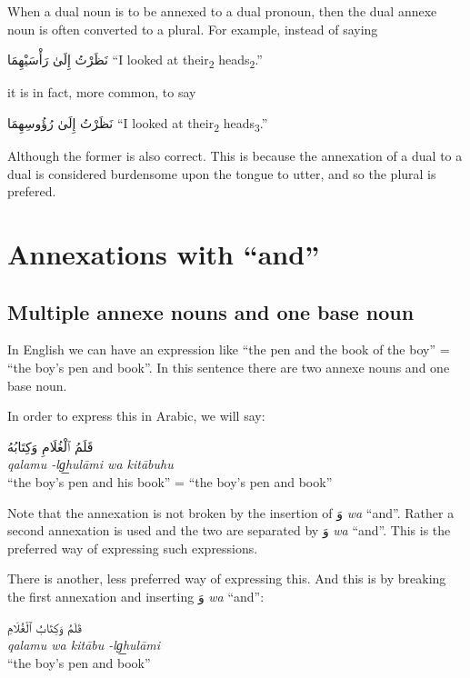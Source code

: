 \documentclass[
  10pt,
]{book}
\begin{document}
When a dual noun is to be annexed to a dual pronoun, then the dual annexe noun is often converted to a plural. For example, instead of saying

\foreignlanguage{arabic}{نَظَرْتُ إِلَىٰ رَأْسَيْهِمَا}
\enquote{I looked at their\textsubscript{2} heads\textsubscript{2}.}

it is in fact, more common, to say

\foreignlanguage{arabic}{نَظَرْتُ إِلَىٰ رُؤُوسِهِمَا}
\enquote{I looked at their\textsubscript{2} heads\textsubscript{3}.}

Although the former is also correct. This is because the annexation of a dual to a dual is considered burdensome upon the tongue to utter, and so the plural is prefered.

\section{\texorpdfstring{Annexations with \enquote{and}}{Annexations with ``and''}}\label{annexations-with-and}

\subsection{Multiple annexe nouns and one base noun}\label{multiple-annexe-nouns-and-one-base-noun}

In English we can have an expression like \enquote{the pen and the book of the boy} = \enquote{the boy's pen and book}. In this sentence there are two annexe nouns and one base noun.

In order to express this in Arabic, we will say:

\foreignlanguage{arabic}{قَلَمُ ٱلْغُلَامِ وَکِتَابُهُ}\\
\emph{qalamu -lg͟hulāmi wa kitābuhu}\\
\enquote{the boy's pen and his book} = \enquote{the boy's pen and book}

Note that the annexation is not broken by the insertion of \foreignlanguage{arabic}{وَ} \emph{wa} \enquote{and}. Rather a second annexation is used and the two are separated by \foreignlanguage{arabic}{وَ} \emph{wa} \enquote{and}. This is the preferred way of expressing such expressions.

There is another, less preferred way of expressing this. And this is by breaking the first annexation and inserting \foreignlanguage{arabic}{وَ} \emph{wa} \enquote{and}:

\foreignlanguage{arabic}{قَلَمُ وَکِتَابُ ٱلْغُلَامِ}\\
\emph{qalamu wa kitābu -lg͟hulāmi}\\
\enquote{the boy's pen and book}
\end{document}
